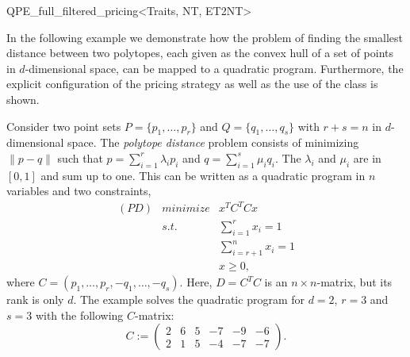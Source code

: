 \begin{ccRefClass}{QPE_full_filtered_pricing<Traits, NT, ET2NT>}
\ccImplementation
\ccIndexImplementation


\ccExample
In the following example we demonstrate how the problem of finding the
smallest distance between two polytopes, each given as the convex hull of a
set of points in
$d$-dimensional space, can be mapped to a quadratic program. Furthermore,
the explicit configuration of the pricing strategy as well as
the use of the class  is shown.  

Consider two point sets $P=\{p_{1}, \ldots, p_{r} \}$ and
$Q=\{q_{1}, \ldots, q_{s} \}$ with $r+s=n$ in $d$-dimensional space. The
\emph{polytope distance} problem consists of minimizing $\|p-q\|$ such that
$p=\sum_{i=1}^{r}\lambda_{i}p_{i}$ and $q=\sum_{i=1}^{s}\mu_{i}q_{i}$. The
$\lambda_{i}$ and $\mu_{i}$ are in $\left[0, 1\right]$ and sum up to one.
This can be written as a quadratic program in $n$ variables and two constraints,
\begin{eqnarray*}
(PD) & minimize & x^{T}C^{T}Cx  \\
     & s.t.     & \sum_{i=1}^{r}x_{i} = 1 \\
     &          & \sum_{i=r+1}^{n}x_{i} = 1 \\
     &          & x \geq 0,
\end{eqnarray*}
where $C=(p_{1}, \ldots , p_{r}, -q_{1}, \ldots, -q_{s})$. Here, $D=C^{T}C$ is an
$n \times n$-matrix, but its rank is only $d$. The example solves the quadratic
program for $d=2$, $r=3$ and $s=3$ with the following $C$-matrix:
\[
C:=
\left(\begin{array}{cccccc}
        2 & 6 & 5 & -7 & -9 & -6 \\
	2 & 1 & 5 & -4 & -7 & -7
      \end{array}
\right).
\]


\end{ccRefClass}


